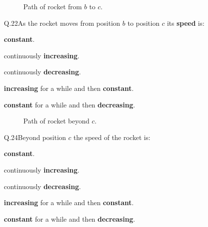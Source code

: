 
    \begin{figure}[h!]
        \begin{center}
            
            \caption{\label{fig:rocket_paths_21} Path of rocket from $b$ to $c$.}
        \end{center}
    \end{figure}

    \begin{mcq}{Q.22}{As the rocket moves from position $b$ to position $c$ its \textbf{speed} is:}
        \item \textbf{constant}.
        \item continuously \textbf{increasing}.
        \item continuously \textbf{decreasing}.
        \item \textbf{increasing} for a while and then \textbf{constant}.
        \item \textbf{constant} for a while and then \textbf{decreasing}.
    \end{mcq}



    \begin{figure}[h!]
        \begin{center}
            
            \caption{\label{fig:rocket_paths_23} Path of rocket beyond $c$.}
        \end{center}
    \end{figure}


    \begin{mcq}{Q.24}{Beyond position $c$ the speed of the rocket is:}
        \item \textbf{constant}.
        \item continuously \textbf{increasing}.
        \item continuously \textbf{decreasing}.
        \item \textbf{increasing} for a while and then \textbf{constant}.
        \item \textbf{constant} for a while and then \textbf{decreasing}.
    \end{mcq}


